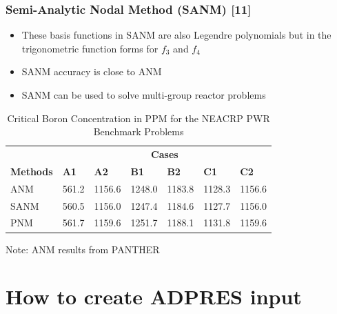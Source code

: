 \documentclass{beamer}
\begin{document}
\begin{frame}
\frametitle{Semi-Analytic Nodal Method (SANM) [11]}
\begin{itemize}
\item These basis functions in SANM are also Legendre polynomials but in the trigonometric function forms for $f_3$ and $f_4$
\item SANM accuracy is close to ANM
\item SANM can be used to solve multi-group reactor problems
\end{itemize}
\begin{table}{}
  \caption{Critical Boron Concentration in PPM for the NEACRP PWR Benchmark Problems}
  \begin{tabular}{p{2cm}p{1.2cm}p{1.2cm}p{1.2cm}p{1.2cm}p{1.2cm}p{1.2cm}}
  \toprule
        {}         & \multicolumn{6}{c}{\textbf{Cases}} \\
  \cmidrule{2-7}
  \textbf{Methods} & \textbf{A1} & \textbf{A2} & \textbf{B1} & \textbf{B2} & \textbf{C1} & \textbf{C2}\\
  \midrule
  ANM  & 561.2 & 1156.6 & 1248.0 & 1183.8 & 1128.3 & 1156.6  \\
  SANM & 560.5 & 1156.0 & 1247.4 & 1184.6 & 1127.7 & 1156.0  \\
  PNM & 561.7 & 1159.6 & 1251.7 & 1188.1 & 1131.8 & 1159.6  \\
  \bottomrule
  \end{tabular}
  \begin{flushleft}
  Note: ANM results from PANTHER
  \end{flushleft}
\end{table}
\end{frame}

\section{How to create ADPRES input}
\end{document}
